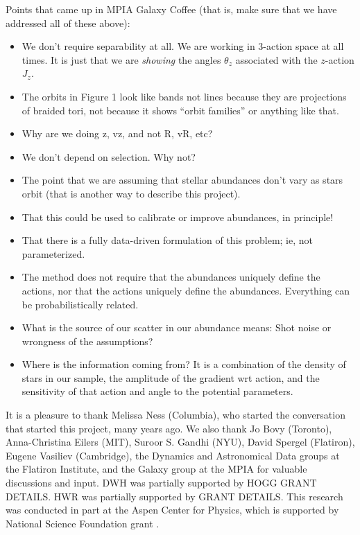 \documentclass[modern]{aastex63}
\begin{document}
Points that came up in MPIA Galaxy Coffee (that is, make sure that we
have addressed all of these above):
\begin{itemize}
\item
  We don't require separability at all. We are working in 3-action
  space at all times. It is just that we are \emph{showing} the angles
  $\theta_z$ associated with the $z$-action $J_z$.
\item
  The orbits in Figure 1 look like bands not lines because they are
  projections of braided tori, not because it shows ``orbit families''
  or anything like that.
\item
  Why are we doing z, vz, and not R, vR, etc?
\item
  We don't depend on selection. Why not?
\item
  The point that we are assuming that stellar abundances don't vary as
  stars orbit (that is another way to describe this project).
\item
  That this could be used to calibrate or improve abundances, in
  principle!
\item
  That there is a fully data-driven formulation of this problem; ie, not
  parameterized.
\item
  The method does not require that the abundances uniquely define the
  actions, nor that the actions uniquely define the
  abundances. Everything can be probabilistically related.
\item
  What is the source of our scatter in our abundance means: Shot noise
  or wrongness of the assumptions?
\item
  Where is the information coming from? It is a combination of the
  density of stars in our sample, the amplitude of the gradient wrt
  action, and the sensitivity of that action and angle to the potential
  parameters.
\end{itemize}

\acknowledgments
It is a pleasure to thank
  Melissa Ness (Columbia),
  who started the conversation that started this project, many years ago.
We also thank
  Jo Bovy (Toronto),
  Anna-Christina Eilers (MIT),
  Suroor S. Gandhi (NYU),
  David Spergel (Flatiron),
  Eugene Vasiliev (Cambridge),
  the Dynamics and Astronomical Data groups at the Flatiron Institute,
  and the Galaxy group at the MPIA
for valuable discussions and input.
DWH was partially supported by HOGG GRANT DETAILS.
HWR was partially supported by GRANT DETAILS.
This research was conducted in part at the Aspen Center for Physics,
which is supported by National Science Foundation grant .
\end{document}
